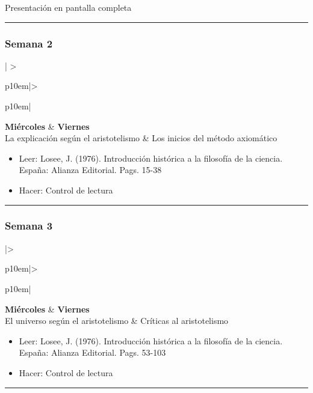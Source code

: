 \documentclass[spanish,]{article}
\begin{document}
Presentación en pantalla completa

\begin{center}\rule{0.5\linewidth}{\linethickness}\end{center}

\subsubsection{Semana 2}\label{semana-2}

\begin{tabular}{| >{\raggedright\arraybackslash}p{10em}|>{\raggedright\arraybackslash}p{10em}|} \hline
\textbf{Miércoles} & \textbf{Viernes}\\
\hline
La explicación según el aristotelismo & Los inicios del método axiomático\\
\hline
\end{tabular}

\begin{itemize}
\item
  Leer: Losee, J. (1976). Introducción histórica a la filosofía de la
  ciencia. España: Alianza Editorial. Pags. 15-38
\item
  Hacer: Control de lectura
\end{itemize}

\begin{center}\rule{0.5\linewidth}{\linethickness}\end{center}

\subsubsection{Semana 3}\label{semana-3}

\begin{tabular}{|>{\raggedright\arraybackslash}p{10em}|>{\raggedright\arraybackslash}p{10em}|}\hline
\textbf{Miércoles} & \textbf{Viernes}\\
\hline
El universo según el aristotelismo & Críticas al aristotelismo\\
\hline
\end{tabular}

\begin{itemize}
\item
  Leer: Losee, J. (1976). Introducción histórica a la filosofía de la
  ciencia. España: Alianza Editorial. Pags. 53-103
\item
  Hacer: Control de lectura
\end{itemize}

\begin{center}\rule{0.5\linewidth}{\linethickness}\end{center}
\end{document}
